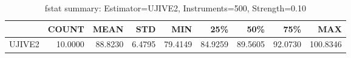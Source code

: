 \begin{table}[ht]
\centering
\caption{fstat summary: Estimator=UJIVE2, Instruments=500, Strength=0.10}
\begin{tabular}{lrrrrrrrr}
\toprule
 & COUNT & MEAN & STD & MIN & 25\% & 50\% & 75\% & MAX \\
\midrule
UJIVE2 & 10.0000 & 88.8230 & 6.4795 & 79.4149 & 84.9259 & 89.5605 & 92.0730 & 100.8346 \\
\bottomrule
\end{tabular}
\end{table}
